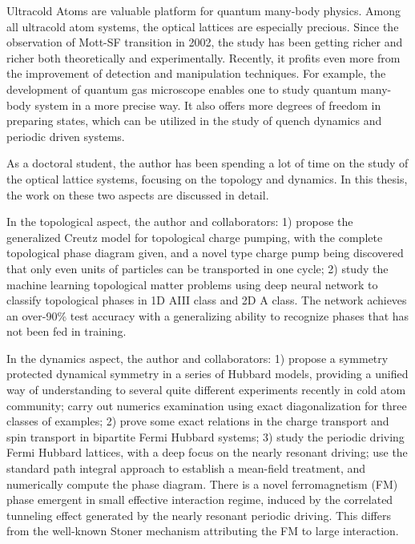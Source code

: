 \begin{eabstract}
Ultracold Atoms are valuable platform for quantum many-body physics. Among all ultracold atom systems, the optical lattices are especially precious. Since the observation of Mott-SF transition in 2002, the study has been getting richer and richer both theoretically and experimentally. Recently, it profits even more from the improvement of detection and manipulation techniques. For example, the development of quantum gas microscope enables one to study quantum many-body system in a more precise way. It also offers more degrees of freedom in preparing states, which can be utilized in the study of quench dynamics and periodic driven systems.

As a doctoral student, the author has been spending a lot of time on the study of the optical lattice systems, focusing on the topology and dynamics. In this thesis, the work on these two aspects are discussed in detail. 

In the topological aspect, the author and collaborators:
1) propose the generalized Creutz model for topological charge pumping, with the complete topological phase diagram given, and a novel type charge pump being discovered that only even units of particles can be transported in one cycle;
2) study the machine learning topological matter problems using deep neural network to classify topological phases in 1D AIII class and 2D A class. The network achieves an over-90\% test accuracy with a generalizing ability to recognize phases that has not been fed in training.

In the dynamics aspect, the author and collaborators:
1) propose a symmetry protected dynamical symmetry in a series of Hubbard models, providing a unified way of understanding to several quite different experiments recently in cold atom community; carry out numerics examination using exact diagonalization for three classes of examples; 
2) prove some exact relations in the charge transport and spin transport in bipartite Fermi Hubbard systems;
3) study the periodic driving Fermi Hubbard lattices, with a deep focus on the nearly resonant driving; use the standard path integral approach to establish a mean-field treatment, and numerically compute the phase diagram. There is a novel ferromagnetism (FM) phase emergent in small effective interaction regime, induced by the correlated tunneling effect generated by the nearly resonant periodic driving. This differs from the well-known Stoner mechanism attributing the FM to large interaction. 
\end{eabstract}

